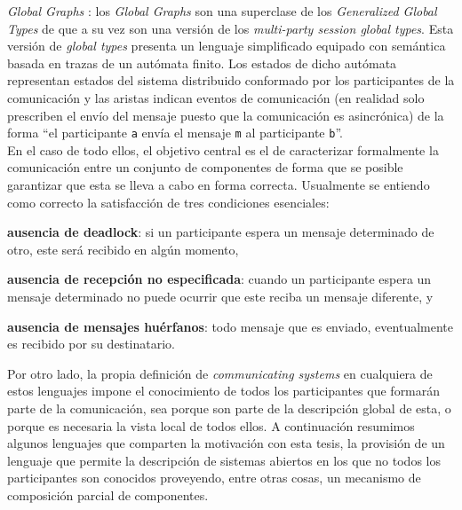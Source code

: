 \emph{Global Graphs} \cite{castagna:lmcs-8_1}: los \emph{Global Graphs} son una superclase de los \emph{Generalized Global Types} de \cite{denielou:esop12} que a su vez son una versión de los \emph{multi-party session global types}. Esta versión de \emph{global types} presenta un lenguaje simplificado equipado con semántica basada en trazas de un autómata finito. Los estados de dicho autómata representan estados del sistema distribuido conformado por los participantes de la comunicación y las aristas indican eventos de comunicación (en realidad solo prescriben el envío del mensaje puesto que la comunicación es asincrónica) de la forma ``el participante {\tt a} envía el mensaje {\tt m} al participante {\tt b}''.\\

En el caso de todo ellos, el objetivo central es el de caracterizar formalmente la comunicación entre un conjunto de componentes de forma que se posible garantizar que esta se lleva a cabo en forma correcta. Usualmente se entiendo como correcto la satisfacción de tres condiciones esenciales:
\begin{inparaenum}[1)]
\item {\bf ausencia de deadlock}: si un participante espera un mensaje determinado de otro, este será recibido en algún momento, 
\item {\bf ausencia de recepción no especificada}: cuando un participante espera un mensaje determinado no puede ocurrir que este reciba un mensaje diferente, y
\item {\bf ausencia de mensajes huérfanos}: todo mensaje que es enviado, eventualmente es recibido por su destinatario.
\end{inparaenum}

Por otro lado, la propia definición de \emph{communicating systems} en cualquiera de estos lenguajes impone el conocimiento de todos los participantes que formarán parte de la comunicación, sea porque son parte de la descripción global de esta, o porque es necesaria la vista local de todos ellos. A continuación resumimos algunos lenguajes que comparten la motivación con esta tesis, la provisión de un lenguaje que permite la descripción de sistemas abiertos en los que no todos los participantes son conocidos proveyendo, entre otras cosas, un mecanismo de composición parcial de componentes.\\

